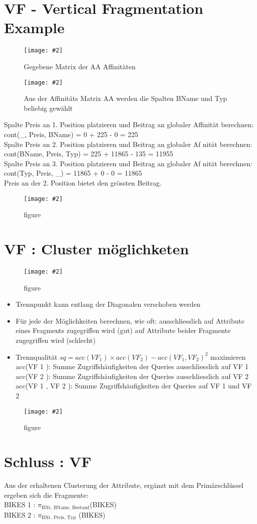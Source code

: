 \documentclass[a4paper,10pt,titlepage=false]{scrreprt}
\newcommand{\pic}[2][figure]{\begin{figure}[h]
 \centering
 \texttt{[image: \#2]}
 \caption{#1}
\end{figure}
}
\begin{document}
\section{VF - Vertical Fragmentation Example}
\pic[Gegebene Matrix der AA Affinitäten]{vfb1.png}
\pic[Aus der Affinitäts Matrix AA werden
die Spalten BName und Typ beliebig
gewählt]{vfb2.png}
Spalte Preis an 1. Position
platzieren und Beitrag an globaler
Affinität berechnen:\\
cont(\_, Preis, BName) =
0 + 225 - 0 = 225\\
Spalte Preis an 2. Position platzieren
und Beitrag an globaler Af nität
berechnen:\\
cont(BName, Preis, Typ) =
225 + 11865 - 135 = 11955\\
Spalte Preis an 3. Position platzieren
und Beitrag an globaler Af nität
berechnen:\\
cont(Typ, Preis, \_) = 11865 + 0 - 0 =
11865  \\

Preis an der 2. Position bietet den grössten Beitrag.

\pic{vfb5.png}

\section{VF : Cluster möglichketen}
  \pic{vfcm.png}
\begin{itemize}
 \item Trennpunkt kann entlang der Diagonalen verschoben
werden
\item Für jede der Möglichkeiten berechnen, wie oft:
\subitem ausschliesslich auf Attribute eines Fragments
zugegriffen wird (gut)
\subitem auf Attribute beider Fragmente zugegriffen wird
(schlecht)
\item Trennqualität $sq = acc(VF_1 ) \times acc(VF_2 ) - acc(VF_1 , VF_2 )^2$
maximieren
\subitem acc(VF 1 ): Summe Zugriffshäufigkeiten der Queries
ausschliesslich auf VF 1
\subitem acc(VF 2 ): Summe Zugriffshäufigkeiten der Queries
ausschliesslich auf VF 2
\subitem acc(VF 1 , VF 2 ): Summe Zugriffshäufigkeiten der Queries
auf VF 1 und VF 2
\end{itemize}
\pic{vfse.png}

\section{Schluss : VF}
Aus der erhaltenen Clusterung der Attribute, ergänzt mit
dem Primärschlüssel ergeben sich die Fragmente:\\
BIKES 1 : $\pi_{\text{BNr, BName, Bestand}}$(BIKES)\\
BIKES 2 : $\pi_{\text{BNr, Preis, Typ}}$ (BIKES)\\
\end{document}
